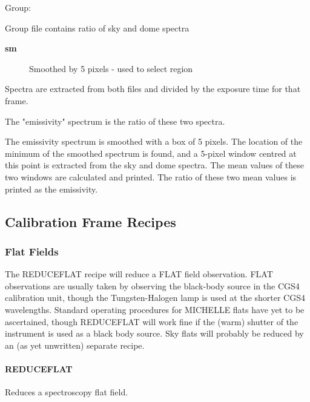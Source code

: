 \documentclass[twoside,11pt]{article}
\renewcommand{\_}{\texttt{\symbol{95}}}
\begin{document}
Group:



Group file contains ratio of sky and dome spectra

\begin{description}

\item[\textbf{\_sm}] \mbox{}

Smoothed by 5 pixels - used to select region

\end{description}


Spectra are extracted from both files and divided by the exposure time
for that frame.



The "emissivity" spectrum is the ratio of these two spectra.



The emissivity spectrum is smoothed with a box of 5 pixels.  The
location of the minimum of the smoothed spectrum is found, and a
5-pixel window centred at this point is extracted from the sky and
dome spectra.  The mean values of these two windows are calculated and
printed.  The ratio of these two mean values is printed as the
emissivity.


\subsection{Calibration Frame Recipes}

\subsubsection{Flat Fields}

The REDUCE\_FLAT recipe will reduce a FLAT field observation. FLAT
observations are usually taken by observing the black-body source in
the CGS4 calibration unit, though the Tungsten-Halogen lamp is used at
the shorter CGS4 wavelengths. Standard operating procedures for
MICHELLE flats have yet to be ascertained, though REDUCE\_FLAT will
work fine if the (warm) shutter of the instrument is used as a black
body source. Sky flats will probably be reduced by an (as yet
unwritten) separate recipe.

\paragraph{REDUCE\_FLAT\label{REDUCE_FLAT}}


Reduces a spectroscopy flat field.
\end{document}
